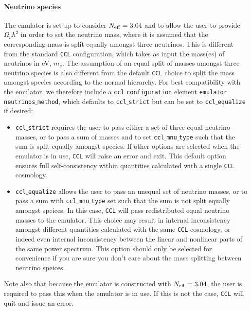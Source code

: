 \documentclass[\docopts]{\docclass}
\newcommand{\ccl}{{\tt CCL}\xspace}
\begin{document}
\paragraph{Neutrino species} The emulator is set up to consider $N_{\rm eff}=3.04$ and to allow the user to provide $\Omega_\nu h^2$ in order to set the neutrino mass, where it is assumed that the corresponding mass is split equally amongst three neutrinos. This is different from the standard {\tt CCL} configuration, which takes as input the mass(es) of neutrinos in eV, $m_{\nu}$. The assumption of an equal split of masses amongst three neutrino species is also different from the default \ccl choice to split the mass amongst species according to the normal hierarchy. For best compatibility with the emulator, we therefore include a {\tt ccl$\_$configuration} element {\tt emulator$\_$neutrinos$\_$method}, which defaults to {\tt ccl$\_$strict} but can be set to {\tt ccl$\_$equalize} if desired:
\begin{itemize}
\item{{\tt ccl$\_$strict} requires the user to pass either a set of three equal neutrino masses, or to pass a sum of masses and to set {\tt ccl$\_$mnu$\_$type} such that the sum is split equally amongst species. If other options are selected when the emulator is in use, \ccl will raise an error and exit. This default option ensures full self-consistency within quantities calculated with a single \ccl cosmology.}
\item{{\tt ccl$\_$equalize} allows the user to pass an unequal set of neutrino masses, or to pass a sum with {\tt ccl$\_$mnu$\_$type} set such that the sum is not split equally amongst speices. In this case, \ccl will pass redistributed equal neutrino masses to the emulator. This choice may result in internal inconsistency amongst different quantities calculated with the same \ccl cosmology, or indeed even internal inconsistency between the linear and nonlinear parts of the same power spectrum. This option should only be selected for convenience if you are sure you don't care about the mass splitting between neutrino speices.}
\end{itemize}

Note also that because the emulator is constructed with $N_{\rm eff}=3.04$, the user is required to pass this when the emulator is in use.  If this is not the case, {\tt CCL} will quit and issue an error.
\end{document}

